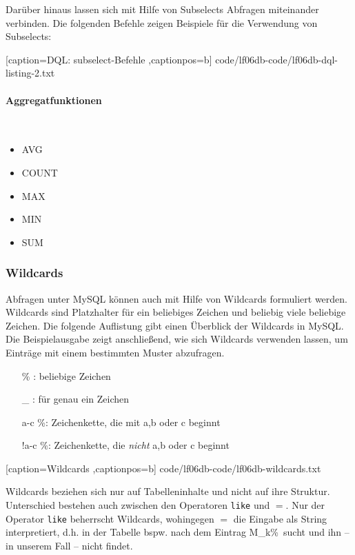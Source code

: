 Darüber hinaus lassen sich mit Hilfe von Subselects Abfragen miteinander verbinden. Die folgenden Befehle zeigen Beispiele für die Verwendung von Subselects:


	[caption={DQL: subselect-Befehle}
	\label{lst:dql-subselect},captionpos=b]
	{code/lf06db-code/lf06db-dql-listing-2.txt}
	
\paragraph{Aggregatfunktionen}~\\
\begin{itemize}
	\item AVG
	\item COUNT
	\item MAX
	\item MIN
	\item SUM
\end{itemize}

\subsubsection{Wildcards}

Abfragen unter MySQL können auch mit Hilfe von Wildcards formuliert werden. Wildcards sind Platzhalter für ein beliebiges Zeichen und beliebig viele beliebige Zeichen. Die folgende Auflistung gibt einen Überblick der Wildcards in MySQL. Die Beispielausgabe zeigt anschließend, wie sich Wildcards verwenden lassen, um Einträge mit einem bestimmten Muster abzufragen.

\begin{itemize}
	\item [\%]: beliebige Zeichen
	\item [\_]: für genau ein Zeichen
	\item [a-c]\%: Zeichenkette, die mit a,b oder c beginnt  
	\item [!a-c]\%: Zeichenkette, die \emph{nicht} a,b oder c beginnt
\end{itemize}


	[caption={Wildcards}
	\label{lst:wildcards},captionpos=b]
	{code/lf06db-code/lf06db-wildcards.txt}

Wildcards beziehen sich nur auf Tabelleninhalte und nicht auf ihre Struktur. Unterschied bestehen auch zwischen den Operatoren \texttt{like} und $=$. Nur der Operator \texttt{like} beherrscht Wildcards, wohingegen $=$ die Eingabe als String interpretiert, d.h. in der Tabelle bspw. nach dem Eintrag \ql M\_k\%\qr\ sucht und ihn -- in unserem Fall -- nicht findet.

